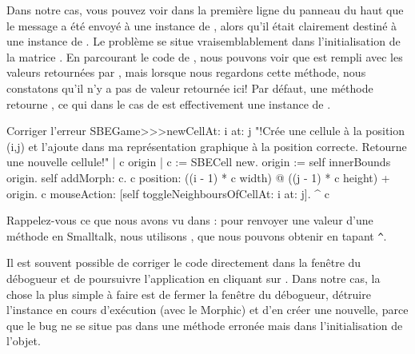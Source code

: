 \documentclass[a4paper,10pt,twoside]{book}
\begin{document}
Dans notre cas, vous pouvez voir dans la première ligne du panneau du haut que le message  a été envoyé à une instance de , alors qu'il était clairement destiné à une instance de .
Le problème se situe vraisemblablement dans l'initialisation de la matrice .
En parcourant le code de , nous pouvons
voir que  est rempli avec les valeurs retournées par
, mais lorsque nous regardons cette méthode, nous
constatons qu'il n'y a pas de valeur retournée ici!
Par défaut, une méthode retourne , ce qui dans le cas de  est effectivement une instance de .


\begin{method}{Corriger l'erreur}
SBEGame>>>newCellAt: i at: j
    "!Crée une cellule à la position (i,j) et l'ajoute dans ma représentation graphique à la position correcte. Retourne une nouvelle cellule!"
   | c origin |
   c := SBECell new.
   origin := self innerBounds origin.
   self addMorph: c.
   c position: ((i - 1) * c width) @ ((j - 1) * c height) + origin.
   c mouseAction: [self toggleNeighboursOfCellAt: i at: j].
   ^ c
\end{method}

\noindent
Rappelez-vous ce que nous avons vu dans :
pour renvoyer une valeur d'une méthode en Smalltalk, nous utilisons 
 \ct{^}, que nous pouvons obtenir en tapant \verb|^|.

Il est souvent possible de corriger le code directement dans la
fen\^etre du débogueur et de poursuivre l'application en cliquant sur
.
Dans notre cas, la chose la plus simple à faire est de fermer la
fen\^etre du débogueur, détruire l'instance en cours d'exécution (avec
le  Morphic) et d'en créer une nouvelle, parce que le bug
ne se situe pas dans une méthode erronée mais dans
l'initialisation de l'objet.
\end{document}
